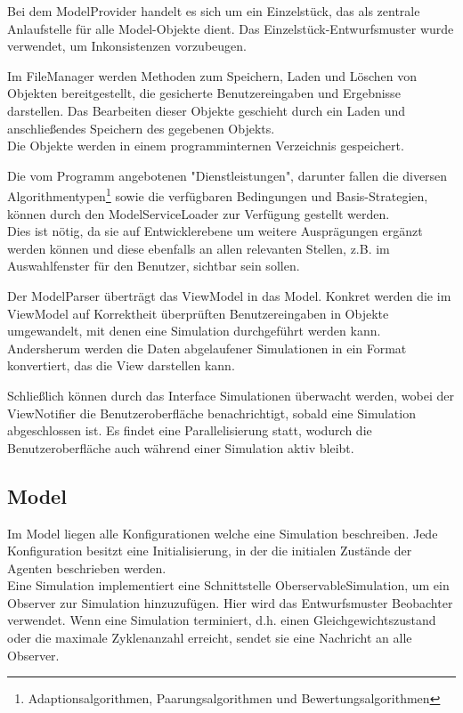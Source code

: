 Bei dem ModelProvider handelt es sich um ein Einzelstück, das als zentrale Anlaufstelle für alle Model-Objekte dient. Das Einzelstück-Entwurfsmuster wurde verwendet, um Inkonsistenzen vorzubeugen.

Im FileManager werden Methoden zum Speichern, Laden und Löschen von Objekten bereitgestellt, die gesicherte Benutzereingaben und Ergebnisse darstellen. Das Bearbeiten dieser Objekte geschieht durch ein Laden und anschließendes Speichern des gegebenen Objekts.\\
Die Objekte werden in einem programminternen Verzeichnis gespeichert.

Die vom Programm angebotenen "Dienstleistungen", darunter fallen die diversen Algorithmentypen\footnote{Adaptionsalgorithmen, Paarungsalgorithmen und Bewertungsalgorithmen} sowie die verfügbaren Bedingungen und Basis-Strategien, können durch den ModelServiceLoader zur Verfügung gestellt werden.\\
Dies ist nötig, da sie auf Entwicklerebene um weitere Ausprägungen ergänzt werden können und diese ebenfalls an allen relevanten Stellen, z.B. im Auswahlfenster für den Benutzer, sichtbar sein sollen.

Der ModelParser überträgt das ViewModel in das Model. Konkret werden die im ViewModel auf Korrektheit überprüften Benutzereingaben in Objekte umgewandelt, mit denen eine Simulation durchgeführt werden kann. Andersherum werden die Daten abgelaufener Simulationen in ein Format konvertiert, das die View darstellen kann.

Schließlich können durch das Interface Simulationen überwacht werden, wobei der ViewNotifier die Benutzeroberfläche benachrichtigt, sobald eine Simulation abgeschlossen ist. Es findet eine Parallelisierung statt, wodurch die Benutzeroberfläche auch während einer Simulation aktiv bleibt.

\subsection{Model}

\noindent
{}


Im Model liegen alle Konfigurationen welche eine Simulation beschreiben. Jede Konfiguration besitzt eine Initialisierung, in der die initialen Zustände der Agenten beschrieben werden. \\

Eine Simulation implementiert eine Schnittstelle OberservableSimulation, um ein Observer zur Simulation hinzuzufügen. Hier wird das Entwurfsmuster Beobachter verwendet. Wenn eine Simulation terminiert, d.h. einen Gleichgewichtszustand oder die maximale Zyklenanzahl erreicht, sendet sie eine Nachricht an alle Observer.\\

